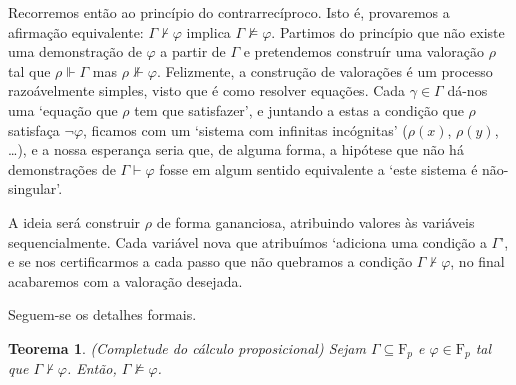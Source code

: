 \documentclass{report}
\newtheorem{teorema}{Teorema}
\theoremstyle{definition}
\theoremstyle{remark}
\newcommand{\F}{\mathrm{F}}
\begin{document}
	Recorremos então ao princípio do contrarrecíproco. Isto é, provaremos a afirmação equivalente: $\Gamma \nvdash \varphi$ implica $\Gamma \nvDash \varphi$. Partimos do princípio que não existe uma demonstração de $\varphi$ a partir de $\Gamma$ e pretendemos construír uma valoração $\rho$ tal que $\rho \Vdash \Gamma$ mas $\rho \nVdash \varphi$. Felizmente, a construção de valorações é um processo razoávelmente simples, visto que é como resolver equações. Cada $\gamma \in \Gamma$ dá-nos uma `equação que $\rho$ tem que satisfazer', e juntando a estas a condição que $\rho$ satisfaça $\neg \varphi$, ficamos com um `sistema com infinitas incógnitas' ($\rho(x)$, $\rho(y)$, \dots), e a nossa esperança seria que, de alguma forma, a hipótese que não há demonstrações de $\Gamma \vdash \varphi$ fosse em algum sentido equivalente a `este sistema é não-singular'.
	
	A ideia será construir $\rho$ de forma gananciosa, atribuindo valores às variáveis sequencialmente. Cada variável nova que atribuímos `adiciona uma condição a $\Gamma$', e se nos certificarmos a cada passo que não quebramos a condição $\Gamma \nvdash \varphi$, no final acabaremos com a valoração desejada.
	
	Seguem-se os detalhes formais.
	
	\begin{teorema} (Completude do cálculo proposicional)
	Sejam $\Gamma \subseteq \F_p$ e $\varphi \in \F_p$ tal que $\Gamma \nvdash \varphi$. Então, $\Gamma \nvDash \varphi$.
	\end{teorema}
	
\end{document}

